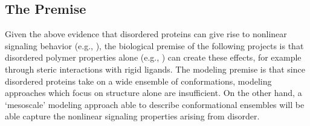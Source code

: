 \documentclass[../AdvancementSummary.tex]{subfiles}
\begin{document}
\subsection{The Premise}
%
%

Given the above evidence that disordered proteins can give rise to nonlinear signaling behavior (e.g., ), the biological premise of the following projects is that disordered polymer properties alone (e.g., ) can create these effects, for example through steric interactions with rigid ligands. 
The modeling premise is that since disordered proteins take on a wide ensemble of conformations, modeling approaches which focus on structure alone are insufficient. On the other hand, a `mesoscale' modeling approach able to describe conformational ensembles will be able capture the nonlinear signaling properties arising from disorder.

\end{document}
